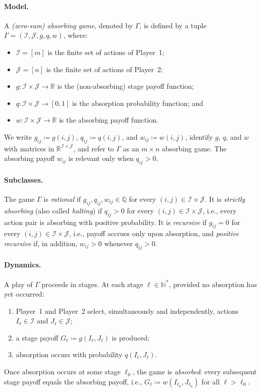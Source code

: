 \documentclass[11pt, a4paper]{article}
\theoremstyle{plain}
\theoremstyle{definition}
\newcommand{\Q}{\mathbb{Q}}
\newcommand{\R}{\mathbb{R}}
\newcommand{\N}{\mathbb{N}}
\newcommand{\defas}{\coloneqq}
\newcommand{\I}{\mathcal{I}}
\newcommand{\J}{\mathcal{J}}
\begin{document}
\paragraph{Model.}
A \emph{(zero-sum) absorbing game}, denoted by $\Gamma$, is defined by a tuple $\Gamma=(\I,\J,g,q,w)$, where:
\begin{itemize}
\item $\I=[m]$ is the finite set of actions of Player~1;
\item $\J=[n]$ is the finite set of actions of Player~2;
\item $g\colon\I\times\J\to\R$ is the (non-absorbing) stage payoff function;
\item $q\colon\I\times\J\to[0,1]$ is the absorption probability function; and 
\item $w\colon\I\times\J\to\R$ is the absorbing payoff function.
\end{itemize}
We write $g_{ij}\defas g(i,j)$, $q_{ij}\defas q(i,j)$, and $w_{ij}\defas w(i,j)$, identify $g$, $q$, and $w$ with matrices in $\R^{\I\times\J}$, and refer to $\Gamma$ as an $m\times n$ absorbing game. The absorbing payoff $w_{ij}$ is relevant only when $q_{ij}>0$.

\paragraph{Subclasses.}
The game $\Gamma$ is \emph{rational} if $g_{ij},q_{ij},w_{ij}\in\Q$ for every $(i,j)\in\I\times\J$. It is \emph{strictly absorbing} (also called \emph{halting}) if $q_{ij}>0$ for every $(i,j)\in\I\times\J$, i.e., every action pair is absorbing with positive probability.
It is \emph{recursive} if $g_{ij}=0$ for every $(i,j)\in\I\times\J$, i.e., payoff accrues only upon absorption, and \emph{positive recursive} if, in addition, $w_{ij}>0$ whenever $q_{ij}>0$.

\paragraph{Dynamics.}
A play of $\Gamma$ proceeds in stages. At each stage $\ell\in\N^*$, provided no absorption has yet occurred:
\begin{enumerate}
\item Player~1 and Player~2 select, simultaneously and independently, actions $I_\ell\in\I$ and $J_\ell\in\J$;
\item a stage payoff $G_\ell\defas g(I_\ell,J_\ell)$ is produced;
\item absorption occurs with probability $q(I_\ell,J_\ell)$.
\end{enumerate}
Once absorption occurs at some stage $\ell_0$, the game is \emph{absorbed}: every subsequent stage payoff equals the absorbing payoff, i.e., $G_\ell\defas w(I_{\ell_0},J_{\ell_0})$ for all $\ell>\ell_0$.
\end{document}
